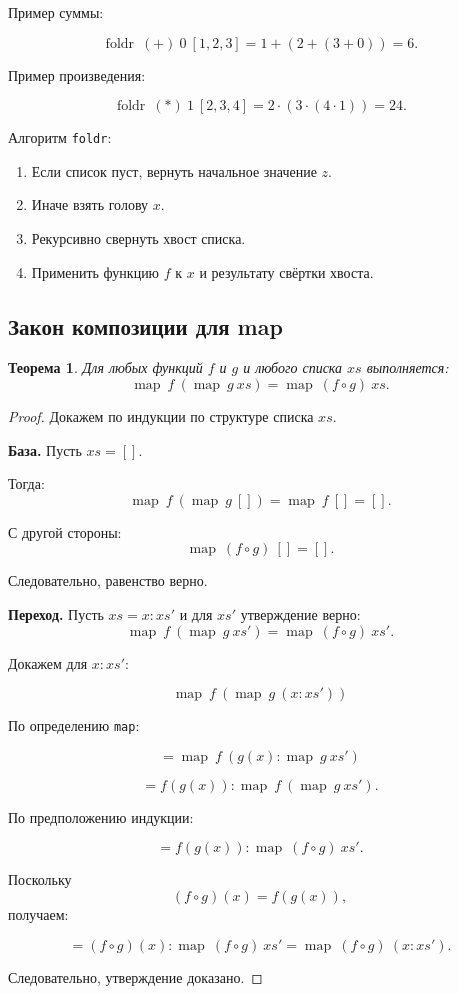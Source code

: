 \documentclass[12pt,a4paper]{article}
\newtheorem{theorem}{Теорема}
\begin{document}
Пример суммы:

\[
\operatorname{foldr}\ (+)\ 0\ [1,2,3]
=
1 + (2 + (3 + 0))
=
6.
\]

Пример произведения:

\[
\operatorname{foldr}\ (*)\ 1\ [2,3,4]
=
2 \cdot (3 \cdot (4 \cdot 1))
=
24.
\]

Алгоритм \texttt{foldr}:

\begin{enumerate}
  \item Если список пуст, вернуть начальное значение $z$.
  \item Иначе взять голову $x$.
  \item Рекурсивно свернуть хвост списка.
  \item Применить функцию $f$ к $x$ и результату свёртки хвоста.
\end{enumerate}

\subsection{Закон композиции для map}

\begin{theorem}
Для любых функций $f$ и $g$ и любого списка $xs$ выполняется:
\[
\operatorname{map}\ f\ (\operatorname{map}\ g\ xs)
=
\operatorname{map}\ (f \circ g)\ xs.
\]
\end{theorem}

\begin{proof}
Докажем по индукции по структуре списка $xs$.

\textbf{База.} Пусть $xs = []$.

Тогда:
\[
\operatorname{map}\ f\ (\operatorname{map}\ g\ [])
=
\operatorname{map}\ f\ []
=
[].
\]

С другой стороны:
\[
\operatorname{map}\ (f \circ g)\ []
=
[].
\]

Следовательно, равенство верно.

\textbf{Переход.} Пусть $xs = x:xs'$ и для $xs'$ утверждение верно:
\[
\operatorname{map}\ f\ (\operatorname{map}\ g\ xs')
=
\operatorname{map}\ (f \circ g)\ xs'.
\]

Докажем для $x:xs'$:

\[
\operatorname{map}\ f\ (\operatorname{map}\ g\ (x:xs'))
\]

По определению \texttt{map}:

\[
=
\operatorname{map}\ f\ (g(x) : \operatorname{map}\ g\ xs')
\]

\[
=
f(g(x)) : \operatorname{map}\ f\ (\operatorname{map}\ g\ xs').
\]

По предположению индукции:

\[
=
f(g(x)) : \operatorname{map}\ (f \circ g)\ xs'.
\]

Поскольку
\[
(f \circ g)(x) = f(g(x)),
\]
получаем:

\[
=
(f \circ g)(x) : \operatorname{map}\ (f \circ g)\ xs'
=
\operatorname{map}\ (f \circ g)\ (x:xs').
\]

Следовательно, утверждение доказано.
\end{proof}
\end{document}
